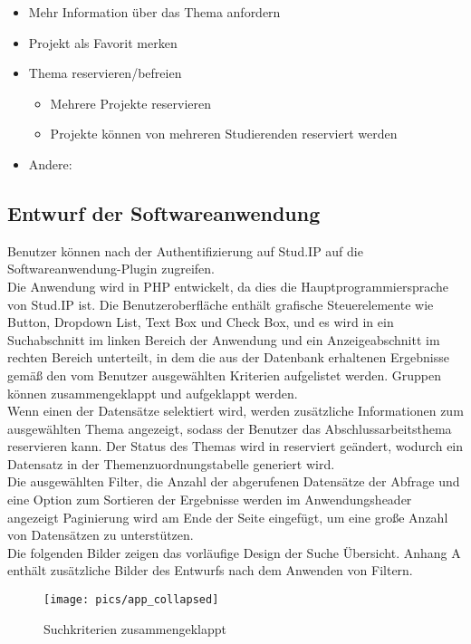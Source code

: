 	\begin{itemize}
	\item Mehr Information über das Thema anfordern
	\item Projekt als Favorit merken
	\item Thema reservieren/befreien
	\begin{itemize}[noitemsep]
		\item Mehrere Projekte reservieren
		\item Projekte können von mehreren Studierenden reserviert werden
	\end{itemize}
	\item Andere:	
	\end{itemize}

\subsection{Entwurf der Softwareanwendung}
Benutzer können nach der Authentifizierung auf Stud.IP auf die Softwareanwendung-Plugin zugreifen.\\
Die Anwendung wird in PHP entwickelt, da dies die Hauptprogrammiersprache von Stud.IP ist.
Die Benutzeroberfläche enthält grafische Steuerelemente wie Button, Dropdown List, Text Box und Check Box, und es wird in ein Suchabschnitt im linken Bereich der Anwendung und ein Anzeigeabschnitt im rechten Bereich unterteilt, in dem die aus der Datenbank erhaltenen Ergebnisse gemä{\ss} den vom Benutzer ausgewählten Kriterien aufgelistet werden. Gruppen können zusammengeklappt und  aufgeklappt werden.\\

Wenn einen der Datensätze selektiert wird, werden zusätzliche Informationen zum ausgewählten Thema angezeigt, sodass der Benutzer das Abschlussarbeitsthema reservieren kann. Der Status des Themas wird in reserviert geändert, wodurch ein Datensatz in der Themenzuordnungstabelle generiert wird.\\
Die ausgewählten Filter, die Anzahl der abgerufenen Datensätze der Abfrage und eine Option zum Sortieren der Ergebnisse werden im Anwendungsheader angezeigt
Paginierung wird am Ende der Seite eingefügt, um eine gro{\ss}e Anzahl von Datensätzen zu unterstützen.\\

Die folgenden Bilder zeigen das vorläufige Design der Suche Übersicht. Anhang A enthält zusätzliche Bilder des Entwurfs nach dem Anwenden von Filtern.

\begin{figure}[hp]%
    \centering
    \texttt{[image: pics/app\_collapsed]}\\
    \caption{Suchkriterien zusammengeklappt}
\end{figure}

